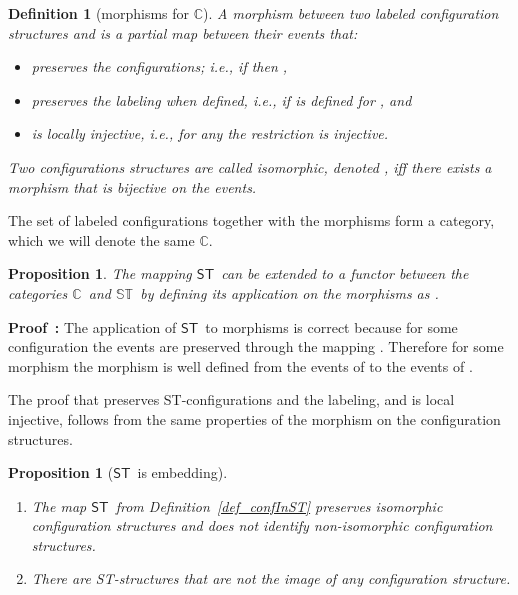 \documentclass[submission,copyright,creativecommons]{eptcs}
\newtheorem{proposition}[theorem]{Proposition}
\newtheorem{definition}[theorem]{Definition}
\newenvironment{proof}[1][\!\!\,]{\vspace{1ex}\noindent\textbf{Proof #1: }}{\hfill\vspace{2ex}}
\newcommand\allC{\ensuremath{\mathbb{C}}}
\newcommand\allST{\ensuremath{\mathbb{ST}}}
\newcommand\cintost{\ensuremath{\mathsf{ST}}}
\begin{document}
\begin{definition}[morphisms for \allC]\label{def_morphisms_C}
A \emph{morphism} between two labeled configuration structures  and  is a partial map  between their events that: 
\vspace{-1ex}\begin{itemize}
\item 
preserves the configurations; i.e., if  then ,
\item 
preserves the labeling when defined, i.e.,  if  is defined for , and 
\item
is locally injective, i.e., for any  the restriction  is injective.
\end{itemize} 
Two configurations structures are called \emph{isomorphic}, denoted , iff there exists a morphism  that is bijective on the events.
\end{definition}

The set of labeled configurations together with the morphisms form a category, which we will denote the same \allC.

\begin{proposition}\label{prop_functorExtension_cintost}
The mapping \cintost\ can be extended to a functor between the categories \allC\ and \allST\ by defining its application on the morphisms as .
\end{proposition}

\begin{proof}
The application of \cintost\ to morphisms is correct because for some configuration  the events are preserved through the mapping . Therefore for some morphism  the morphism  is well defined from the events of  to the events of .

The proof that  preserves ST-configurations and the labeling, and is local injective, follows from the same properties of the morphism  on the configuration structures.
\end{proof}



\begin{proposition}[\cintost\ is embedding]\label{prop_embeding_CtoST}
\ 

\begin{enumerate}
\item The map \cintost\ from Definition~\ref{def_confInST} preserves isomorphic configuration structures and does not identify non-isomorphic configuration structures.

\item There are ST-structures that are not the image of any configuration structure.
\end{enumerate}
\end{proposition}
\end{document}
